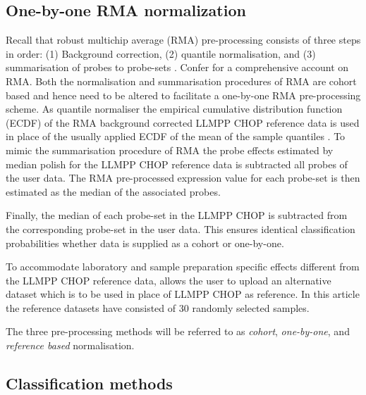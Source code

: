 \documentclass{article}
\begin{document}


\subsection{One-by-one RMA normalization}
Recall that robust multichip average (RMA) pre-processing consists of three steps in order:
(1) Background correction,
(2) quantile normalisation, and
(3) summarisation of probes to probe-sets \citep{Irizarry2003}.
Confer \citet{Bolstad2004} for a comprehensive account on RMA.
Both the normalisation and summarisation procedures of RMA are cohort based and hence need to be altered to facilitate a one-by-one RMA pre-processing scheme.
As quantile normaliser the empirical cumulative distribution function (ECDF) of the RMA background corrected LLMPP CHOP reference data is used in place of the usually applied ECDF of the mean of the sample quantiles \citep{Bolstad2003}.
To mimic the summarisation procedure of RMA \citep{Irizarry2003b} the probe effects estimated by median polish for the LLMPP CHOP reference data is subtracted all probes of the user data.
The RMA pre-processed expression value for each probe-set is then estimated as the median of the associated probes.

Finally, the median of each probe-set in the LLMPP CHOP is subtracted from the corresponding probe-set in the user data.
This ensures identical classification probabilities whether data is supplied as a cohort or one-by-one.

To accommodate laboratory and sample preparation specific effects different from the LLMPP CHOP reference data, \hemaClass{} allows the user to upload an alternative dataset which is to be used in place of LLMPP CHOP as reference.
In this article the reference datasets have consisted of $30$ randomly selected samples.

The three pre-processing methods will be referred to as \emph{cohort}, \emph{one-by-one}, and \emph{reference based} normalisation.


\subsection{Classification methods}
\end{document}
